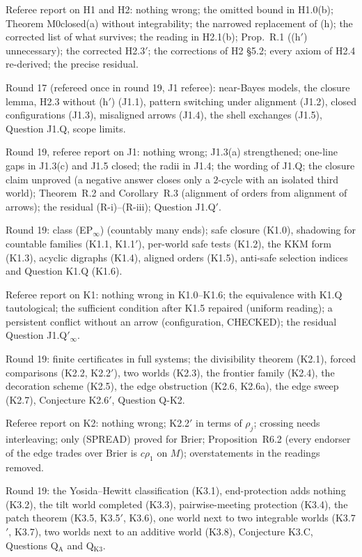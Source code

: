 \documentclass[11pt]{article}
\theoremstyle{definition}
\theoremstyle{remark}
\begin{document}
\begin{description}[leftmargin=*,font=\normalfont\ttfamily,style=nextline]
\item[H12\_referee.md] Referee report on H1 and H2: nothing wrong; the omitted bound in H1.0(b); Theorem M0closed(a) without integrability; the narrowed replacement of (h); the corrected list of what survives; the reading in H2.1(b); Prop.~R.1 ((h$'$) unnecessary); the corrected H2.3$'$; the corrections of H2 \S5.2; every axiom of H2.4 re-derived; the precise residual.
\item[J1\_notes.md] Round 17 (refereed once in round 19, J1 referee): near-Bayes models, the closure lemma, H2.3 without (h$'$) (J1.1), pattern switching under alignment (J1.2), closed configurations (J1.3), misaligned arrows (J1.4), the shell exchanges (J1.5), Question J1.Q, scope limits.
\item[J1\_referee.md] Round 19, referee report on J1: nothing wrong; J1.3(a) strengthened; one-line gaps in J1.3(c) and J1.5 closed; the radii in J1.4; the wording of J1.Q; the closure claim unproved (a negative answer closes only a $2$-cycle with an isolated third world); Theorem~R.2 and Corollary~R.3 (alignment of orders from alignment of arrows); the residual (R-i)--(R-iii); Question J1.Q$'$.
\item[K1\_notes.md] Round 19: class (EP$_\infty$) (countably many ends); safe closure (K1.0), shadowing for countable families (K1.1, K1.1$'$), per-world safe tests (K1.2), the KKM form (K1.3), acyclic digraphs (K1.4), aligned orders (K1.5), anti-safe selection indices and Question K1.Q (K1.6).
\item[K1\_referee.md] Referee report on K1: nothing wrong in K1.0--K1.6; the equivalence with K1.Q tautological; the sufficient condition after K1.5 repaired (uniform reading); a persistent conflict without an arrow (configuration, CHECKED); the residual Question J1.Q$'_\infty$.
\item[K2\_notes.md] Round 19: finite certificates in full systems; the divisibility theorem (K2.1), forced comparisons (K2.2, K2.2$'$), two worlds (K2.3), the frontier family (K2.4), the decoration scheme (K2.5), the edge obstruction (K2.6, K2.6a), the edge sweep (K2.7), Conjecture K2.6$'$, Question Q-K2.
\item[K2\_referee.md] Referee report on K2: nothing wrong; K2.2$'$ in terms of $\rho_j$; crossing needs interleaving; only (SPREAD) proved for Brier; Proposition~R6.2 (every endorser of the edge trades over Brier is $c\rho_1$ on $M$); overstatements in the readings removed.
\item[K3\_notes.md] Round 19: the Yosida--Hewitt classification (K3.1), end-protection adds nothing (K3.2), the tilt world completed (K3.3), pairwise-meeting protection (K3.4), the patch theorem (K3.5, K3.5$'$, K3.6), one world next to two integrable worlds (K3.7$'$, K3.7), two worlds next to an additive world (K3.8), Conjecture K3.C, Questions Q$_{\mathrm A}$ and Q$_{\mathrm{K3}}$.

\end{description}
\end{document}
